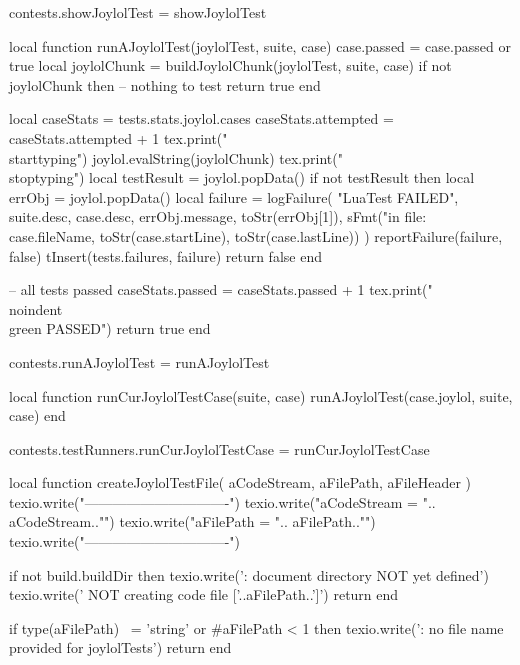 contests.showJoylolTest = showJoylolTest
\stopLuaCode

\startLuaCode
local function runAJoylolTest(joylolTest, suite, case)
  case.passed = case.passed or true
  local joylolChunk = buildJoylolChunk(joylolTest, suite, case)
  if not joylolChunk then
    -- nothing to test
    return true
  end

  local caseStats = tests.stats.joylol.cases
  caseStats.attempted = caseStats.attempted + 1
  tex.print("\\starttyping")
  joylol.evalString(joylolChunk)
  tex.print("\\stoptyping")
  local testResult = joylol.popData()
  if not testResult then
    local errObj = joylol.popData()
    local failure = logFailure(
      "LuaTest FAILED",
      suite.desc,
      case.desc,
      errObj.message,
      toStr(errObj[1]),
      sFmt("in file: %
        case.fileName, toStr(case.startLine), toStr(case.lastLine))
      )
    reportFailure(failure, false)
    tInsert(tests.failures, failure)
    return false
  end

  -- all tests passed
  caseStats.passed = caseStats.passed + 1
  tex.print("\\noindent{\\green PASSED}")
  return true
end

contests.runAJoylolTest = runAJoylolTest

local function runCurJoylolTestCase(suite, case)
  runAJoylolTest(case.joylol, suite, case)
end

contests.testRunners.runCurJoylolTestCase = runCurJoylolTestCase
\stopLuaCode

\startMkIVCode
\def\createJoylolTestFile#1#2#3{
  \directlua{
    thirddata.contests.createJoylolTestFile('#1', '#2', '#3')
  }
}
\stopMkIVCode

\startLuaCode
local function createJoylolTestFile(
  aCodeStream, aFilePath, aFileHeader
)
  texio.write("\n-------------------------------\n")
  texio.write("aCodeStream = ".. aCodeStream.."\n")
  texio.write("aFilePath   = ".. aFilePath.."\n")
  texio.write("\n-------------------------------\n")

  if not build.buildDir then
    texio.write('\nERROR: document directory NOT yet defined\n')
    texio.write('       NOT creating code file ['..aFilePath..']\n\n')
    return
  end

  if type(aFilePath) ~= 'string'
    or #aFilePath < 1 then
    texio.write('\nERROR: no file name provided for joylolTests\n\n')
    return
  end

